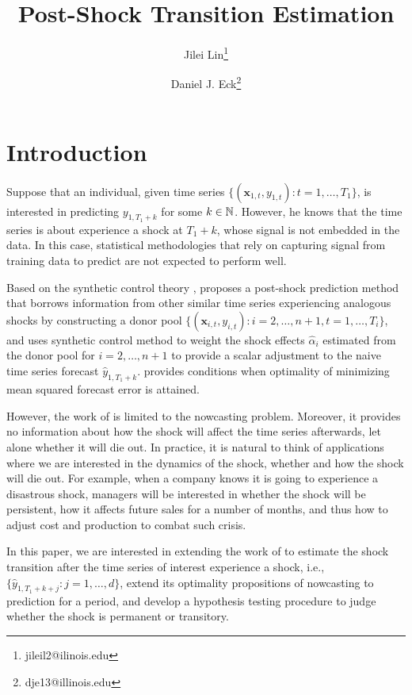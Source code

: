 \documentclass[12pt]{article}
\title{Post-Shock Transition Estimation}
\author{Jilei Lin\thanks{jileil2@ilinois.edu} }
\author{Daniel J. Eck\thanks{dje13@illinois.edu}}
\affil{Department of Statistics, University of Illinois at Urbana-Champaign}
\begin{document}
\maketitle

\section{Introduction}

Suppose that an individual, given time series $\{(\mathbf{x}_{1, t},y_{1,t})\colon t=1, \ldots, T_1\}$, is interested in predicting $y_{1, T_1+k}$ for some $k \in \mathbb{N}$. However,  he knows that the time series is about experience a shock at $T_1+k$, whose signal is not embedded in the data. In this case,   statistical methodologies that rely on capturing signal from training data to predict are not expected to perform well. 


Based on the synthetic control theory \cite{abadie2010synthetic}, \citet{lin2020minimizing} proposes a post-shock prediction method that borrows information from other similar  time series experiencing analogous shocks by constructing a donor pool $\{(\mathbf{x}_{i, t},y_{i,t})\colon i = 2, \ldots, n +1, t = 1, \ldots, T_i\}$, and uses synthetic control method to weight the shock effects $\hat{\alpha}_i$ estimated from the donor pool for $i = 2, \ldots, n+1$ to provide a scalar adjustment to the naive time series forecast $\hat{y}_{1, T_1+k}$. \citet{lin2020minimizing} provides conditions when  optimality of minimizing mean squared forecast error is attained.


However, the work of \citet{lin2020minimizing} is limited to the nowcasting problem. Moreover, it provides no information about how the shock will affect the time series afterwards, let alone whether it will die out.  In practice, it is natural to think of applications where we are interested in the dynamics of the shock, whether and how the shock will die out. For example, when a company knows it is going to experience a disastrous shock, managers will be interested in  whether the shock will be persistent, how it affects future sales for a number of months, and thus how to adjust cost and production to combat such crisis. 

In this paper, we are interested in extending the work of \citet{lin2020minimizing} to estimate the shock transition after the time series of interest experience a shock, i.e., $\{\hat{y}_{1, T_1+k+j}\colon j = 1, \ldots, d\}$, extend its optimality propositions of nowcasting to prediction for a period, and develop a hypothesis testing procedure to judge whether the shock is permanent or transitory.
\end{document}
